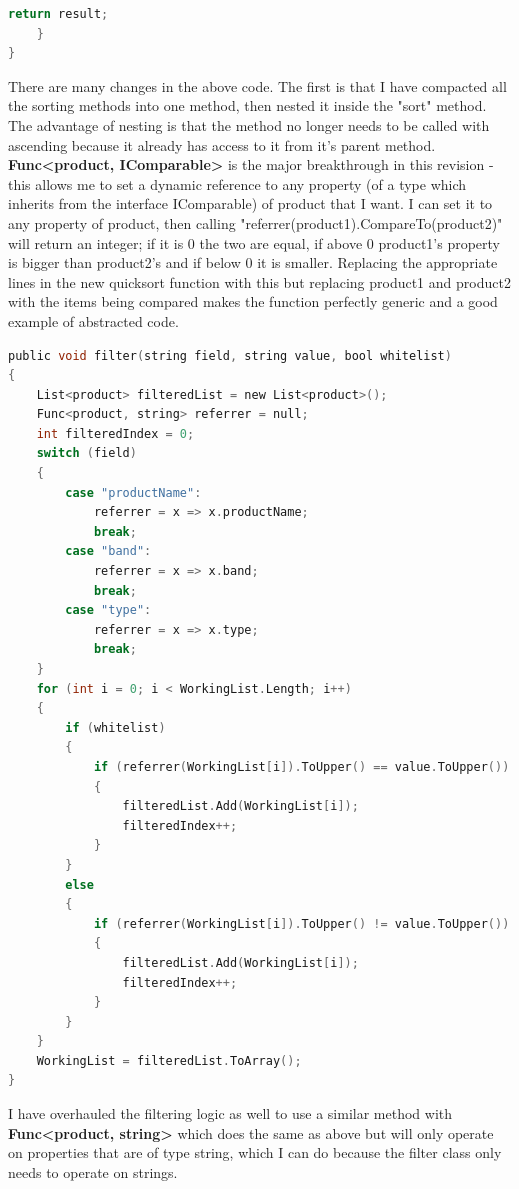 ﻿\documentclass{article}
\begin{document}
\begin{enumerate}
\begin{lstlisting}[language=C]
        return result;
    }
}
        \end{lstlisting}
        There are many changes in the above code.
        The first is that I have compacted all the sorting methods into one method, then nested it inside the "sort" method.
        The advantage of nesting is that the method no longer needs to be called with ascending because it already has access to it from it's parent method.
        \textbf{Func<product, IComparable>} is the major breakthrough in this revision - this allows me to set a dynamic reference to any property (of a type which inherits from the interface IComparable) of product that I want.
        I can set it to any property of product, then calling "referrer(product1).CompareTo(product2)" will return an integer; if it is 0 the two are equal, if above 0 product1's property is bigger than product2's and if below 0 it is smaller.
        Replacing the appropriate lines in the new quicksort function with this but replacing product1 and product2 with the items being compared makes the function perfectly generic and a good example of abstracted code.
        \begin{lstlisting}[language=C]
public void filter(string field, string value, bool whitelist)
{
    List<product> filteredList = new List<product>();
    Func<product, string> referrer = null;
    int filteredIndex = 0;
    switch (field)
    {
        case "productName":
            referrer = x => x.productName;
            break;
        case "band":
            referrer = x => x.band;
            break;
        case "type":
            referrer = x => x.type;
            break;
    }
    for (int i = 0; i < WorkingList.Length; i++)
    {
        if (whitelist)
        {
            if (referrer(WorkingList[i]).ToUpper() == value.ToUpper())
            {
                filteredList.Add(WorkingList[i]);
                filteredIndex++;
            }
        }
        else
        {
            if (referrer(WorkingList[i]).ToUpper() != value.ToUpper())
            {
                filteredList.Add(WorkingList[i]);
                filteredIndex++;
            }
        }
    }
    WorkingList = filteredList.ToArray();
}
        \end{lstlisting}
        I have overhauled the filtering logic as well to use a similar method with \textbf{Func<product, string>} which does the same as above but will only operate on properties that are of type string, which I can do because the filter class only needs to operate on strings.
    \end{enumerate}
    \newpage
\end{document}
